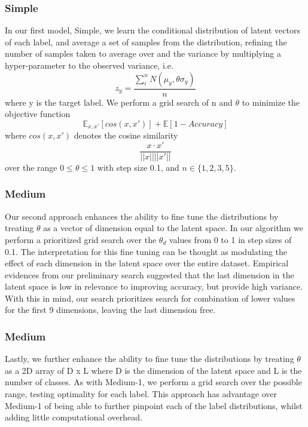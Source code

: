 \documentclass{article}
\begin{document}
\subsubsection{Simple}
In our first model, Simple, we learn the conditional distribution of latent vectors of each label, and average a set of samples from the distribution, refining the number of samples taken to average over and the variance by multiplying a hyper-parameter to the observed variance, i.e.
\begin{equation} 
z_y = \frac{\sum_i^n{N(\mu_y, \theta \sigma_y)}}{n}
\end{equation}
where y is the target label. We perform a grid search of n and $\theta$ to minimize the objective function
\begin{equation} 
\mathbb{E}_{x,x'}[cos(x,x')]+ \mathbb{E}[1 - Accuracy] 
\end{equation}
where $cos(x,x')$ denotes the cosine similarity
\begin{equation}
\frac{x\cdot x'}{||x||||x'||}
\end{equation}
over the range $0 \le \theta \le 1$ with step size 0.1, and $n \in \{1,2,3,5\}$.

\subsubsection{Medium}
Our second approach enhances the ability to fine tune the distributions by treating $\theta$ as a vector of dimension equal to the latent space. In our algorithm we perform a prioritized grid search over the $\theta_d$ values from 0 to 1 in step sizes of 0.1. The interpretation for this fine tuning can be thought as modulating the effect of each dimension in the latent space over the entire dataset. Empirical evidences from our preliminary search suggested that the last dimension in the latent space is low in relevance to improving accuracy, but provide high variance. With this in mind, our search prioritizes search for combination of lower values for the first 9 dimensions, leaving the last dimension free.

\subsubsection{Medium}
Lastly, we further enhance the ability to fine tune the distributions by treating $\theta$ as a 2D array of D x L where D is the dimension of the latent space and L is the number of classes. As with Medium-1, we perform a grid search over the possible range, testing optimality for each label. This approach has advantage over Medium-1 of being able to further pinpoint each of the label distributions, whilst adding little computational overhead.
\end{document}
